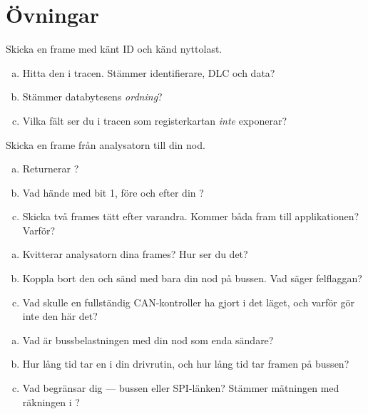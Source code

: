 \section*{Övningar}

\label{ex:14:1}
Skicka en frame med känt ID och känd nyttolast.
\begin{enumerate}[a)]
  \item Hitta den i tracen. Stämmer identifierare, DLC och data?
  \item Stämmer databytesens \emph{ordning}?
  \item Vilka fält ser du i tracen som registerkartan \emph{inte} exponerar?
\end{enumerate}

\label{ex:14:2}
Skicka en frame från analysatorn till din nod.
\begin{enumerate}[a)]
  \item Returnerar  ?
  \item Vad hände med  bit 1, före och efter din ?
  \item Skicka två frames tätt efter varandra. Kommer båda fram till applikationen? Varför?
\end{enumerate}

\label{ex:14:3}
\begin{enumerate}[a)]
  \item Kvitterar analysatorn dina frames? Hur ser du det?
  \item Koppla bort den och sänd med bara din nod på bussen. Vad säger felflaggan?
  \item Vad skulle en fullständig CAN-kontroller ha gjort i det läget, och varför gör inte den
    här det?
\end{enumerate}

\label{ex:14:4}
\begin{enumerate}[a)]
  \item Vad är bussbelastningen med din nod som enda sändare?
  \item Hur lång tid tar en  i din drivrutin, och hur lång tid tar framen på bussen?
  \item Vad begränsar dig --- bussen eller SPI-länken? Stämmer mätningen med räkningen i
    ?
\end{enumerate}
